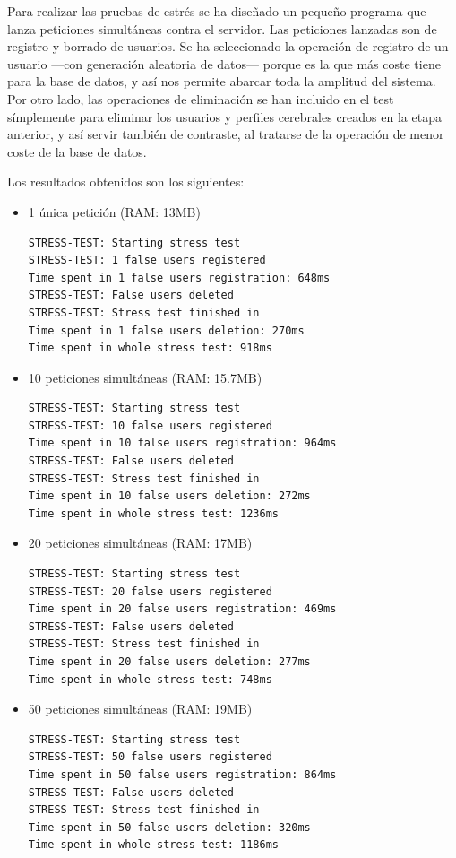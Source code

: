 Para realizar las pruebas de estrés se ha diseñado un pequeño programa que lanza peticiones simultáneas contra el servidor. Las peticiones lanzadas son de registro y borrado de usuarios. Se ha seleccionado la operación de registro de un usuario ---con generación aleatoria de datos--- porque es la que más coste tiene para la base de datos, y así nos permite abarcar toda la amplitud del sistema. Por otro lado, las operaciones de eliminación se han incluido en el test símplemente para eliminar los usuarios y perfiles cerebrales creados en la etapa anterior, y así servir también de contraste, al tratarse de la operación de menor coste de la base de datos.

Los resultados obtenidos son los siguientes:

\begin{itemize}
\item 1 única petición (RAM: 13MB)

  \begin{lstlisting}
STRESS-TEST: Starting stress test
STRESS-TEST: 1 false users registered
Time spent in 1 false users registration: 648ms
STRESS-TEST: False users deleted
STRESS-TEST: Stress test finished in 
Time spent in 1 false users deletion: 270ms
Time spent in whole stress test: 918ms
  \end{lstlisting}
  

\item 10 peticiones simultáneas (RAM: 15.7MB)
  \begin{lstlisting}
STRESS-TEST: Starting stress test
STRESS-TEST: 10 false users registered
Time spent in 10 false users registration: 964ms
STRESS-TEST: False users deleted
STRESS-TEST: Stress test finished in 
Time spent in 10 false users deletion: 272ms
Time spent in whole stress test: 1236ms
  \end{lstlisting}

\item 20 peticiones simultáneas (RAM: 17MB)
  \begin{lstlisting}
STRESS-TEST: Starting stress test
STRESS-TEST: 20 false users registered
Time spent in 20 false users registration: 469ms
STRESS-TEST: False users deleted
STRESS-TEST: Stress test finished in 
Time spent in 20 false users deletion: 277ms
Time spent in whole stress test: 748ms
  \end{lstlisting}

\item 50 peticiones simultáneas (RAM: 19MB)
  \begin{lstlisting}
STRESS-TEST: Starting stress test
STRESS-TEST: 50 false users registered
Time spent in 50 false users registration: 864ms
STRESS-TEST: False users deleted
STRESS-TEST: Stress test finished in 
Time spent in 50 false users deletion: 320ms
Time spent in whole stress test: 1186ms
  \end{lstlisting}


\end{itemize}
